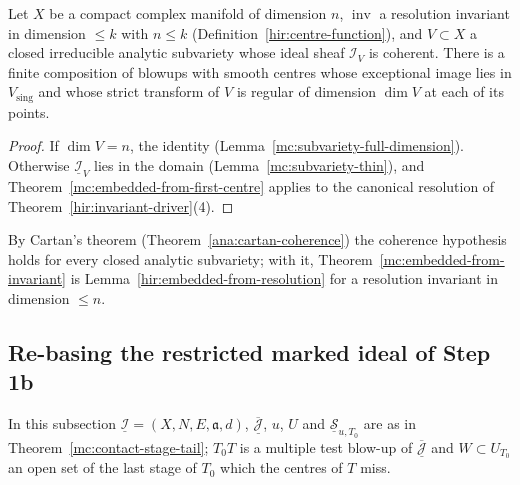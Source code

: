 \begin{theorem}
\label{mc:embedded-from-invariant}
\leanok
Let \(X\) be a compact complex manifold of dimension \(n\), \(\operatorname{inv}\) a resolution invariant in dimension \(\le k\) with \(n\le k\)
(Definition~\ref{hir:centre-function}), and \(V\subset X\) a closed irreducible analytic subvariety whose ideal sheaf \(\mathcal I_V\) is coherent. There is a finite
composition of blowups with smooth centres whose exceptional image lies in \(V_{\mathrm{sing}}\) and whose strict transform of \(V\) is regular of dimension \(\dim V\)
at each of its points.
\end{theorem}
\begin{proof}
\leanok
If \(\dim V=n\), the identity (Lemma~\ref{mc:subvariety-full-dimension}). Otherwise \(\underline{\mathcal I}_V\) lies in the domain (Lemma~\ref{mc:subvariety-thin}), and
Theorem~\ref{mc:embedded-from-first-centre} applies to the canonical resolution of Theorem~\ref{hir:invariant-driver}(4).
\end{proof}
By Cartan's theorem (Theorem~\ref{ana:cartan-coherence}) the coherence hypothesis holds for every closed analytic subvariety; with it,
Theorem~\ref{mc:embedded-from-invariant} is Lemma~\ref{hir:embedded-from-resolution} for a resolution invariant in dimension \(\le n\).

\subsection{Re-basing the restricted marked ideal of Step 1b}

In this subsection \(\underline{\mathcal I}=(X,N,E,\mathfrak a,d)\), \(\overline{\underline{\mathcal J}}\), \(u\), \(U\) and \(\underline{\mathcal S}_{u,T_0}\) are as in
Theorem~\ref{mc:contact-stage-tail}; \(T_0T\) is a multiple test blow-up of \(\overline{\underline{\mathcal J}}\) and \(W\subset U_{T_0}\) an open set of the last stage of
\(T_0\) which the centres of \(T\) miss.

